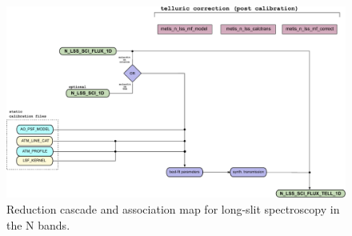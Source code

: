 \begin{landscape}
\begin{figure}[ht]
  \centering
  \includegraphics{figures/N_LSS_pipeline_wf_draft_latest_part_2_v0.84.pdf}
  \caption[Reduction cascade and association map for N long-slit
  spectroscopy]{Reduction cascade and association map for long-slit
    spectroscopy in the N bands. }
  \label{Fig:NLssAssomap2}
\end{figure}
\end{landscape}

